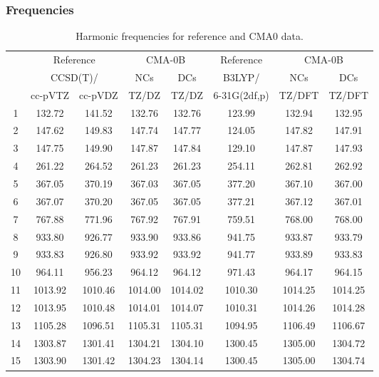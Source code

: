 \documentclass[10pt,oneside]{article}
\begin{document}
\clearpage

\subsubsection*{Frequencies}
\begin{table}[h!]
\centering
\caption{Harmonic frequencies for reference and CMA0 data.}
\begin{tabular}{cccccccc}
\toprule
{} & \multicolumn{2}{c}{Reference} & \multicolumn{2}{c}{CMA-0B} &    Reference & \multicolumn{2}{c}{CMA-0B} \\
{} & \multicolumn{2}{c}{CCSD(T)/} &     NCs &     DCs &       B3LYP/ &     NCs &     DCs \\
{} &   cc-pVTZ & cc-pVDZ &   TZ/DZ &   TZ/DZ & 6-31G(2df,p) &  TZ/DFT &  TZ/DFT \\
\midrule
1  &    132.72 &  141.52 &  132.76 &  132.76 &       123.99 &  132.94 &  132.95 \\
2  &    147.62 &  149.83 &  147.74 &  147.77 &       124.05 &  147.82 &  147.91 \\
3  &    147.75 &  149.90 &  147.87 &  147.84 &       129.10 &  147.87 &  147.93 \\
4  &    261.22 &  264.52 &  261.23 &  261.23 &       254.11 &  262.81 &  262.92 \\
5  &    367.05 &  370.19 &  367.03 &  367.05 &       377.20 &  367.10 &  367.00 \\
6  &    367.07 &  370.20 &  367.05 &  367.05 &       377.21 &  367.12 &  367.01 \\
7  &    767.88 &  771.96 &  767.92 &  767.91 &       759.51 &  768.00 &  768.00 \\
8  &    933.80 &  926.77 &  933.90 &  933.86 &       941.75 &  933.87 &  933.79 \\
9  &    933.83 &  926.80 &  933.92 &  933.92 &       941.77 &  933.89 &  933.83 \\
10 &    964.11 &  956.23 &  964.12 &  964.12 &       971.43 &  964.17 &  964.15 \\
11 &   1013.92 & 1010.46 & 1014.00 & 1014.02 &      1010.30 & 1014.25 & 1014.25 \\
12 &   1013.95 & 1010.48 & 1014.01 & 1014.07 &      1010.31 & 1014.26 & 1014.28 \\
13 &   1105.28 & 1096.51 & 1105.31 & 1105.31 &      1094.95 & 1106.49 & 1106.67 \\
14 &   1303.87 & 1301.41 & 1304.21 & 1304.10 &      1300.45 & 1305.00 & 1304.72 \\
15 &   1303.90 & 1301.42 & 1304.23 & 1304.14 &      1300.45 & 1305.00 & 1304.74 \\

\end{tabular}
\end{table}
\end{document}
